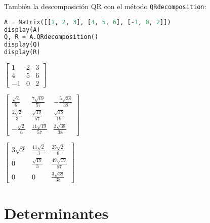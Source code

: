 \documentclass[a4,11pt]{aleph-notas}
\begin{document}
También la descomposición QR con el método \texttt{QRdecomposition}:
\begin{pycodigo}
    \begin{ipynbcodigo}\begin{lstlisting}[language=Python]
A = Matrix([[1, 2, 3], [4, 5, 6], [-1, 0, 2]])
display(A)
Q, R = A.QRdecomposition()
display(Q)
display(R)
    \end{lstlisting}\end{ipynbcodigo}
    \begin{ipynbsalida}[2mm]
    $\displaystyle \left[\begin{matrix}1 & 2 & 3\\4 & 5 & 6\\-1 & 0 & 2\end{matrix}\right]$

    
    $\displaystyle \left[\begin{matrix}\frac{\sqrt{2}}{6} & \frac{7 \sqrt{19}}{57} & - \frac{5 \sqrt{38}}{38}\\\frac{2 \sqrt{2}}{3} & \frac{\sqrt{19}}{57} & \frac{\sqrt{38}}{19}\\- \frac{\sqrt{2}}{6} & \frac{11 \sqrt{19}}{57} & \frac{3 \sqrt{38}}{38}\end{matrix}\right]$

    
    $\displaystyle \left[\begin{matrix}3 \sqrt{2} & \frac{11 \sqrt{2}}{3} & \frac{25 \sqrt{2}}{6}\\0 & \frac{\sqrt{19}}{3} & \frac{49 \sqrt{19}}{57}\\0 & 0 & \frac{3 \sqrt{38}}{38}\end{matrix}\right]$
    \end{ipynbsalida}
\end{pycodigo}


\section{Determinantes}
\end{document}
